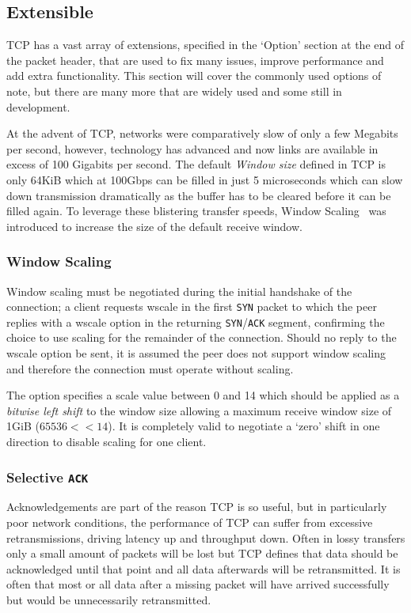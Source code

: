     \subsection{Extensible}
        TCP has a vast array of extensions, specified in the `Option' section at the end of the packet header, that are used to fix many issues, improve performance and add extra functionality. This section will cover the commonly used options of note, but there are many more that are widely used and some still in development.

            At the advent of TCP, networks were comparatively slow of only a few Megabits per second, however, technology has advanced and now links are available in excess of 100 Gigabits per second. The default \textit{Window size} defined in TCP is only 64KiB which at 100Gbps can be filled in just 5 microseconds which can slow down transmission dramatically as the buffer has to be cleared before it can be filled again. To leverage these blistering transfer speeds, Window Scaling~\cite[2]{rfc1323} was introduced to increase the size of the default receive window. 
        \subsubsection{Window Scaling}\label{sec:wscale}

            Window scaling must be negotiated during the initial handshake of the connection; a client requests wscale in the first \texttt{SYN} packet to which the peer replies with a wscale option in the returning \texttt{SYN}/\texttt{ACK} segment, confirming the choice to use scaling for the remainder of the connection. Should no reply to the wscale option be sent, it is assumed the peer does not support window scaling and therefore the connection must operate without scaling.

            The option specifies a scale value between 0 and 14 which should be applied as a \textit{bitwise left shift} to the window size allowing a maximum receive window size of 1GiB ($65536 << 14$). It is completely valid to negotiate a `zero' shift in one direction to disable scaling for one client.

        \subsubsection{Selective \texttt{ACK}}\label{sec:sack}
            Acknowledgements are part of the reason TCP is so useful, but in particularly poor network conditions, the performance of TCP can suffer from excessive retransmissions, driving latency up and throughput down. Often in lossy transfers only a small amount of packets will be lost but TCP defines that data should be acknowledged until that point and all data afterwards will be retransmitted. It is often that most or all data after a missing packet will have arrived successfully but would be unnecessarily retransmitted.

